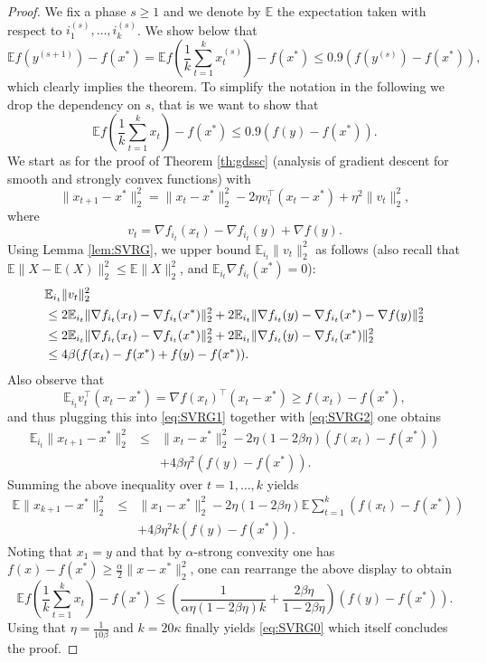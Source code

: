\documentclass[openany]{now}
\newcommand{\E}{\mathbb{E}}
\begin{document}
\begin{proof}
We fix a phase $s \geq 1$ and we denote by $\E$ the expectation taken with respect to $i_1^{(s)}, \hdots, i_k^{(s)}$. We show below that
$$\E f(y^{(s+1)}) - f(x^*) =  \E f\left(\frac1{k} \sum_{t=1}^k x_t^{(s)}\right) - f(x^*)  \leq 0.9 (f(y^{(s)}) - f(x^*)) ,$$
which clearly implies the theorem. To simplify the notation in the following we drop the dependency on $s$, that is we want to show that
\begin{equation} \label{eq:SVRG0}
\E f\left(\frac1{k} \sum_{t=1}^k x_t\right) - f(x^*)  \leq 0.9 (f(y) - f(x^*)) .
\end{equation}
We start as for the proof of Theorem \ref{th:gdssc} (analysis of gradient descent for smooth and strongly convex functions) with
\begin{equation} \label{eq:SVRG1}
\|x_{t+1} - x^*\|_2^2 = \|x_t - x^*\|_2^2 - 2 \eta v_t^{\top}(x_t - x^*) + \eta^2 \|v_t\|_2^2 ,
\end{equation}
where
$$v_t = \nabla f_{i_t}(x_t) - \nabla f_{i_t} (y) + \nabla f(y) .$$
Using Lemma \ref{lem:SVRG}, we upper bound $\E_{i_t} \|v_t\|_2^2$ as follows (also recall that $\E\|X-\E(X)\|_2^2 \leq \E\|X\|_2^2$, and $\E_{i_t} \nabla f_{i_t}(x^*) = 0$):
\begin{align}
& \E_{i_t} \|v_t\|_2^2 \notag \\
& \leq 2 \E_{i_t} \|\nabla f_{i_t}(x_t) - \nabla f_{i_t}(x^*) \|_2^2 + 2 \E_{i_t} \|\nabla f_{i_t}(y) - \nabla f_{i_t}(x^*) - \nabla f(y) \|_2^2 \notag \\
& \leq 2 \E_{i_t} \|\nabla f_{i_t}(x_t) - \nabla f_{i_t}(x^*) \|_2^2 + 2 \E_{i_t} \|\nabla f_{i_t}(y) - \nabla f_{i_t}(x^*) \|_2^2 \notag \\
& \leq 4 \beta (f(x_t) - f(x^*) + f(y) - f(x^*)) . \label{eq:SVRG2}
\end{align}
Also observe that
$$\E_{i_t} v_t^{\top}(x_t - x^*) = \nabla f(x_t)^{\top} (x_t - x^*) \geq f(x_t) - f(x^*) ,$$
and thus plugging this into \eqref{eq:SVRG1} together with \eqref{eq:SVRG2} one obtains
\begin{eqnarray*}
\E_{i_t} \|x_{t+1} - x^*\|_2^2 & \leq & \|x_t - x^*\|_2^2 - 2 \eta (1 - 2 \beta \eta) (f(x_t) - f(x^*)) \\
& & + 4 \beta \eta^2 (f(y) - f(x^*)) .
\end{eqnarray*}
Summing the above inequality over $t=1, \hdots, k$ yields
\begin{eqnarray*} 
\E \|x_{k+1} - x^*\|_2^2 & \leq & \|x_1 - x^*\|_2^2 - 2 \eta (1 - 2 \beta \eta) \E \sum_{t=1}^k (f(x_t) - f(x^*)) \\
& & + 4 \beta \eta^2 k (f(y) - f(x^*)) .
\end{eqnarray*}
Noting that $x_1 = y$ and that by $\alpha$-strong convexity one has $f(x) - f(x^*) \geq \frac{\alpha}{2} \|x - x^*\|_2^2$, one can rearrange the above display to obtain
$$\E f\left(\frac1{k} \sum_{t=1}^k x_t\right) - f(x^*)  \leq \left(\frac{1}{\alpha \eta (1 - 2 \beta \eta) k} + \frac{2 \beta \eta}{1- 2\beta \eta} \right) (f(y) - f(x^*)) .$$
Using that $\eta = \frac{1}{10\beta}$ and $k = 20 \kappa$ finally yields \eqref{eq:SVRG0} which itself concludes the proof.
\end{proof}
\end{document}
